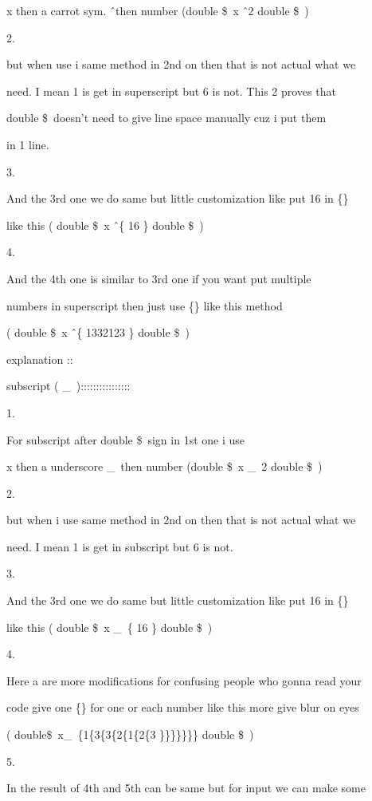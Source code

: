 \documentclass[11pt]{article}
\begin{document}
 x then a carrot sym. \^\ then number (double \$\ x \^\ 2 double \$\ ) 
 
2. 
 
 but when use i same method in 2nd on then that is not actual what we
 
 need. I mean 1 is get in superscript but 6 is not. This 2 proves that
 
 double \$\ doesn't need to give line space manually cuz i put them
 
 in 1 line.
 
 3.
 
 And the 3rd one we do same but little customization like put 16 in \{\}
 
 like this ( double \$\ x \^\ \{ 16 \} double \$\ )
 
 
4.
 
 And the 4th one is similar to 3rd one if you want put multiple 
 
 numbers in superscript then just use \{\} like this method
 
 ( double \$\ x \^\ \{ 1332123 \} double \$\ )

\pagebreak
 explanation ::

 subscript ( \_\ )::::::::::::::::
 
 1.
 
  For subscript after double \$\ sign in 1st one i use 
 
 x then a underscore \_\ then number (double \$\ x \_\ 2 double \$\ ) 
 
2. 
 
 but when i use same method in 2nd on then that is not actual what we
 
 need. I mean 1 is get in subscript but 6 is not.
 
 3.
 
  And the 3rd one we do same but little customization like put 16 in \{\}
 
 like this ( double \$\ x \_\ \{ 16 \} double \$\ ) 
 
 4.
 
 Here a are more modifications for confusing people who gonna read your 
 
 code give one \{\} for one or each number like this more give blur on eyes
 
 ( double\$\ x\_\ \{1\{3\{3\{2\{1\{2\{3 \}\}\}\}\}\}\} double \$\ )
 
 5.
 
 In the result of 4th and 5th can be same but for input we can make some 
 
\end{document}

